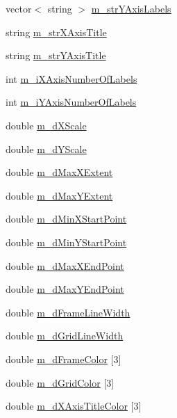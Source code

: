 \begin{DoxyCompactItemize}
\item 
vector$<$ string $>$ \hyperlink{class_c_plot2_d_ad4d97925d3a341f09652d22eadddb1e4}{m\-\_\-str\-Y\-Axis\-Labels}
\item 
string \hyperlink{class_c_plot2_d_a642ae61e2dddca205305d70a21e0ab3f}{m\-\_\-str\-X\-Axis\-Title}
\item 
string \hyperlink{class_c_plot2_d_a3d804a8fd4750822429686e4df2263e9}{m\-\_\-str\-Y\-Axis\-Title}
\item 
int \hyperlink{class_c_plot2_d_a36eefc31bcf98ba9b90817d6d5ec8667}{m\-\_\-i\-X\-Axis\-Number\-Of\-Labels}
\item 
int \hyperlink{class_c_plot2_d_a52bdf7d7185763803433cd879cc8b9e2}{m\-\_\-i\-Y\-Axis\-Number\-Of\-Labels}
\item 
double \hyperlink{class_c_plot2_d_adab27fd03a28f14e399c857da776270c}{m\-\_\-d\-X\-Scale}
\item 
double \hyperlink{class_c_plot2_d_ac38a423e9916689e412bbb2bad4ee487}{m\-\_\-d\-Y\-Scale}
\item 
double \hyperlink{class_c_plot2_d_a15c813fb85f96dd62cea6af3baa4aeba}{m\-\_\-d\-Max\-X\-Extent}
\item 
double \hyperlink{class_c_plot2_d_ab706fb5496f0efc22a6e249b8f8098e1}{m\-\_\-d\-Max\-Y\-Extent}
\item 
double \hyperlink{class_c_plot2_d_af493194c036470eec222e8ba94a5807e}{m\-\_\-d\-Min\-X\-Start\-Point}
\item 
double \hyperlink{class_c_plot2_d_a1a9960282bd4b25fda3f37229e42ec30}{m\-\_\-d\-Min\-Y\-Start\-Point}
\item 
double \hyperlink{class_c_plot2_d_a8027d1df47162ac98bcabd71e981b13d}{m\-\_\-d\-Max\-X\-End\-Point}
\item 
double \hyperlink{class_c_plot2_d_a1fd531f0edce75939f3ea0971dcdf37d}{m\-\_\-d\-Max\-Y\-End\-Point}
\item 
double \hyperlink{class_c_plot2_d_a0c2de9464b391d1952b5f7d56a201338}{m\-\_\-d\-Frame\-Line\-Width}
\item 
double \hyperlink{class_c_plot2_d_ab90840ed700bcc446c4754c31880f1c0}{m\-\_\-d\-Grid\-Line\-Width}
\item 
double \hyperlink{class_c_plot2_d_ab80fd234bcf98f22206e7ffa8c0fe181}{m\-\_\-d\-Frame\-Color} \mbox{[}3\mbox{]}
\item 
double \hyperlink{class_c_plot2_d_a14309a0d60eab0fcb1a22dda976c9782}{m\-\_\-d\-Grid\-Color} \mbox{[}3\mbox{]}
\item 
double \hyperlink{class_c_plot2_d_a4302878445ce4291c00a70baa448e2d2}{m\-\_\-d\-X\-Axis\-Title\-Color} \mbox{[}3\mbox{]}

\end{DoxyCompactItemize}
